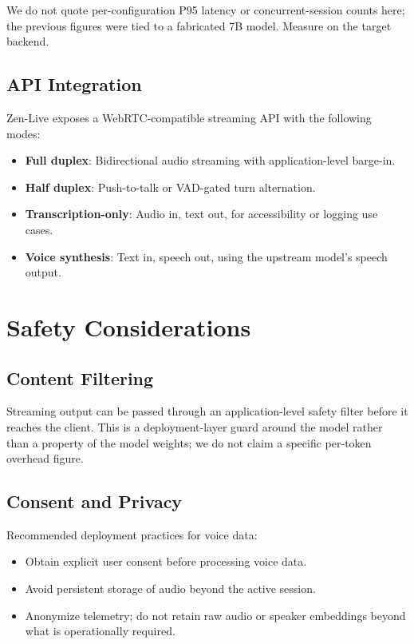 \documentclass[11pt,a4paper]{article}
\begin{document}
We do not quote per-configuration P95 latency or concurrent-session counts here; the
previous figures were tied to a fabricated 7B model. Measure on the target backend.

\subsection{API Integration}

Zen-Live exposes a WebRTC-compatible streaming API with the following modes:

\begin{itemize}
  \item \textbf{Full duplex}: Bidirectional audio streaming with application-level barge-in.
  \item \textbf{Half duplex}: Push-to-talk or VAD-gated turn alternation.
  \item \textbf{Transcription-only}: Audio in, text out, for accessibility or logging use cases.
  \item \textbf{Voice synthesis}: Text in, speech out, using the upstream model's speech output.
\end{itemize}

\section{Safety Considerations}

\subsection{Content Filtering}

Streaming output can be passed through an application-level safety filter before it
reaches the client. This is a deployment-layer guard around the model rather than a
property of the model weights; we do not claim a specific per-token overhead figure.

\subsection{Consent and Privacy}

Recommended deployment practices for voice data:

\begin{itemize}
  \item Obtain explicit user consent before processing voice data.
  \item Avoid persistent storage of audio beyond the active session.
  \item Anonymize telemetry; do not retain raw audio or speaker embeddings beyond what
        is operationally required.
\end{itemize}
\end{document}
